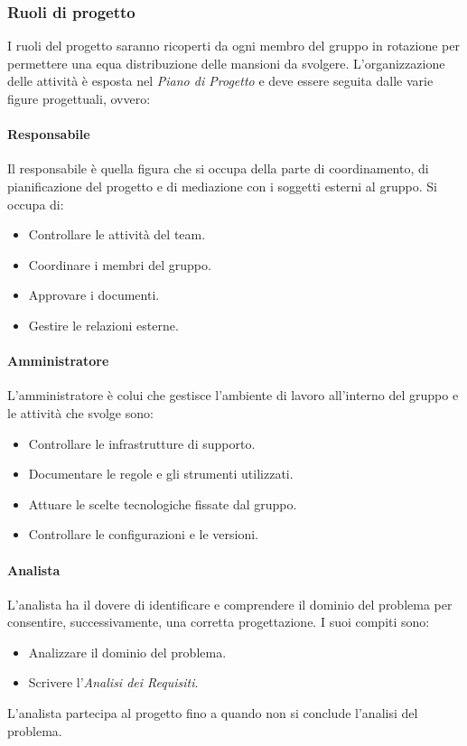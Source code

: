 \subsubsection{Ruoli di progetto}
I ruoli del progetto saranno ricoperti da ogni membro del gruppo in rotazione per permettere
una equa distribuzione delle mansioni da svolgere. L'organizzazione delle attività
è esposta nel \emph{Piano di Progetto} e deve essere seguita dalle varie figure progettuali, ovvero:

\paragraph{Responsabile} \hfill \break
Il responsabile è quella figura che si occupa della parte di coordinamento, di pianificazione del progetto 
e di mediazione con i soggetti esterni al gruppo. Si occupa di:
\begin{itemize}
    \item Controllare le attività del team.
    \item Coordinare i membri del gruppo.
    \item Approvare i documenti.
    \item Gestire le relazioni esterne.
\end{itemize}

\paragraph{Amministratore} \hfill \break
L'amministratore è colui che gestisce l'ambiente di lavoro all'interno del gruppo e le attività che svolge sono:
\begin{itemize}
    \item Controllare le infrastrutture di supporto.
    \item Documentare le regole e gli strumenti utilizzati.
    \item Attuare le scelte tecnologiche fissate dal gruppo.
    \item Controllare le configurazioni e le versioni.
\end{itemize}

\paragraph{Analista} \hfill \break
L'analista ha il dovere di identificare e comprendere il dominio del problema per consentire, successivamente,
una corretta progettazione. I suoi compiti sono:
\begin{itemize}
    \item Analizzare il dominio del problema.
    \item Scrivere l'\emph{Analisi dei Requisiti}.
\end{itemize}
L'analista partecipa al progetto fino a quando non si conclude l'analisi del problema.

